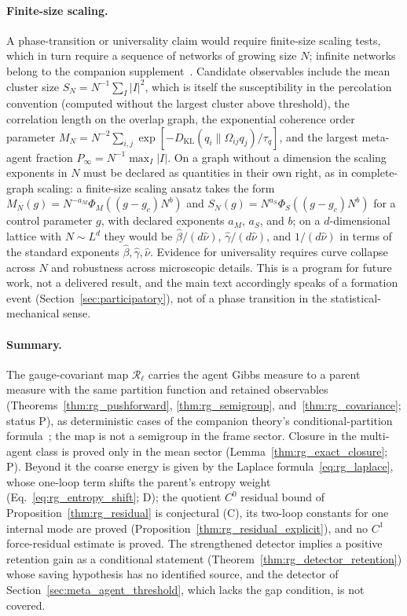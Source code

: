 \documentclass[11pt]{article}
\begin{document}
\paragraph{Finite-size scaling.}
A phase-transition or universality claim would require finite-size scaling tests, which in turn require a sequence of networks of growing size $N$; infinite networks belong to the companion supplement~\cite[Ch.~B5]{DennisGaugeVFESuppB2026}. Candidate observables include the mean cluster size $S_N = N^{-1}\sum_I |I|^2$, which is itself the susceptibility in the percolation convention (computed without the largest cluster above threshold), the correlation length on the overlap graph, the exponential coherence order parameter $M_N = N^{-2}\sum_{i,j}\exp[-D_{\mathrm{KL}}(q_i \| \Omega_{ij}q_j)/\tau_q]$, and the largest meta-agent fraction $P_\infty = N^{-1}\max_I |I|$. On a graph without a dimension the scaling exponents in $N$ must be declared as quantities in their own right, as in complete-graph scaling: a finite-size scaling ansatz takes the form $M_N(g) = N^{-a_M}\Phi_M((g - g_c)N^{b})$ and $S_N(g) = N^{a_S}\Phi_S((g - g_c)N^{b})$ for a control parameter $g$, with declared exponents $a_M$, $a_S$, and $b$; on a $d$-dimensional lattice with $N\sim L^d$ they would be $\hat{\beta}/(d\hat{\nu})$, $\hat{\gamma}/(d\hat{\nu})$, and $1/(d\hat{\nu})$ in terms of the standard exponents $\hat{\beta},\hat{\gamma},\hat{\nu}$. Evidence for universality requires curve collapse across $N$ and robustness across microscopic details. This is a program for future work, not a delivered result, and the main text accordingly speaks of a formation event (Section~\ref{sec:participatory}), not of a phase transition in the statistical-mechanical sense.

\paragraph{Summary.}
The gauge-covariant map $\mathcal{R}_\ell$ carries the agent Gibbs measure to a parent measure with the same partition function and retained observables (Theorems~\ref{thm:rg_pushforward}, \ref{thm:rg_semigroup}, and~\ref{thm:rg_covariance}; status P), as deterministic cases of the companion theory's conditional-partition formula~\cite[Chs.~9 and 11]{DennisGaugeVFE2026}; the map is not a semigroup in the frame sector. Closure in the multi-agent class is proved only in the mean sector (Lemma~\ref{thm:rg_exact_closure}; P). Beyond it the coarse energy is given by the Laplace formula~\eqref{eq:rg_laplace}, whose one-loop term shifts the parent's entropy weight (Eq.~\eqref{eq:rg_entropy_shift}; D); the quotient $C^0$ residual bound of Proposition~\ref{thm:rg_residual} is conjectural (C), its two-loop constants for one internal mode are proved (Proposition~\ref{thm:rg_residual_explicit}), and no $C^1$ force-residual estimate is proved. The strengthened detector implies a positive retention gain as a conditional statement (Theorem~\ref{thm:rg_detector_retention}) whose saving hypothesis has no identified source, and the detector of Section~\ref{sec:meta_agent_threshold}, which lacks the gap condition, is not covered.
\end{document}

